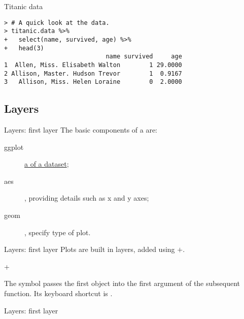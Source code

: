 \documentclass{beamer}
\begin{document}
\begin{frame}[fragile]{Titanic data} 
\begin{verbatim}
> # A quick look at the data.
> titanic.data %>% 
+   select(name, survived, age) %>% 
+   head(3)
                            name survived     age
1  Allen, Miss. Elisabeth Walton        1 29.0000
2 Allison, Master. Hudson Trevor        1  0.9167
3   Allison, Miss. Helen Loraine        0  2.0000
\end{verbatim}

\end{frame}

\subsection{Layers}
\begin{frame}{Layers: first layer}
The basic components of a  are:
\begin{description}
\item[ggplot]  \underline{a  of a dataset};
\item [aes] , providing details such as x and y axes;
\item [geom] , specify type of plot.
\end{description}
\end{frame}


\begin{frame}[fragile]{Layers: first layer}
Plots are built in layers, added using $+$. 

\begin{example}
 \pipe {} + 
\end{example}

\pause
\begin{definition}
The  symbol \pipe passes the first object into the first argument of the subsequent function. Its keyboard shortcut is .
\end{definition}
\end{frame}

\begin{frame}{Layers: first layer}

\begin{example}
 \pipe {}
\end{example}
\end{frame}
\end{document}
